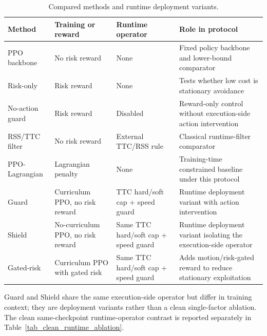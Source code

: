 
\begin{table}[!htbp]
\centering
\caption{Compared methods and runtime deployment variants.}
\label{tab_compared_methods}
\scriptsize
\setlength{\tabcolsep}{3.4pt}
\renewcommand{\arraystretch}{1.08}
\begin{tabular}{@{}>{\raggedright\arraybackslash}p{}>{\raggedright\arraybackslash}p{}>{\raggedright\arraybackslash}p{}>{\raggedright\arraybackslash}p{}@{}}
\toprule
Method & Training or reward & Runtime operator & Role in protocol \\
\midrule
PPO backbone & No risk reward & None & Fixed policy backbone and lower-bound comparator \\
Risk-only & Risk reward & None & Tests whether low cost is stationary avoidance \\
No-action guard & Risk reward & Disabled & Reward-only control without execution-side action intervention \\
RSS/TTC filter & No risk reward & External TTC/RSS rule & Classical runtime-filter comparator \\
PPO-Lagrangian & Lagrangian penalty & None & Training-time constrained baseline under this protocol \\
Guard & Curriculum PPO, no risk reward & TTC hard/soft cap + speed guard & Runtime deployment variant with action intervention \\
Shield & No-curriculum PPO, no risk reward & Same TTC hard/soft cap + speed guard & Runtime deployment variant isolating the execution-side operator \\
Gated-risk & Curriculum PPO with gated risk & Same TTC hard/soft cap + speed guard & Adds motion/risk-gated reward to reduce stationary exploitation \\
\bottomrule
\end{tabular}
\begin{tablenotes}
\item Guard and Shield share the same execution-side operator but differ in training context; they are deployment variants rather than a clean single-factor ablation. The clean same-checkpoint runtime-operator contrast is reported separately in Table~\ref{tab_clean_runtime_ablation}.
\end{tablenotes}
\end{table}
